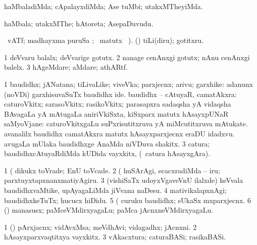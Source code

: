\bentry
{} 
\gl{\kirxvi}
\expl{}
\bmng
haMbaladiMda; cApalayxdiMda; Ase tuMbi; utakxMTheyiMda. 
\emng
\eentry

\bentry
{} 
\gl{\nA}
\expl{}
\bmng
haMbala; utakxMThe; hAtoreta; AsepaDuvudu. 
\emng
\eentry

\bentry
{} 
\gl{\kirx}
  \ucAcx\ vATf; madhayxma puruSa ; \BU\ matutx \BUkaq\ ).\bmng
(\pArxparx) tiLi(diru); gotitxru. 
\emng

\noindent
\gl{\pagu}
\expl{}
\bmng
\bnum
\num{1}  deVvaru balalx; deVvarige gotutx. 
\num{2}  nanage cenAnxgi gotutx; nAnu cenAnxgi balelx. 
\num{3}  hAgeMdare; aMdare; athARtf. 
\enum
\emng
\eentry

\bentry
{} 
\gl{\nA}
\expl{}
\bmng
\bnum
\num{1} baudidhx; jANatana; tiLivaLike; viveVka; parxjecnx; arivu; garxhike:  adanunx (noVDi) garxhisuvaSuTx baudidhx ide. 
 baudidhx -- cAtuyaR, camatAkxra: 
\banum
{} caturoVkitx; sarasoVkitx; rasikoVkitx; parasapxra sadaqsha yA vidaqsha BAvagaLa yA mAtugaLa aniriVkiSxta, kiSxparx matutx hAsayxpUNaR saMyoVjane:  caturoVkitxgaLu suPxrisutitxruva yA miMcutitxruva mAtukate.  avanalilx baudidhx camatAkxra matutx hAsayxparxjecnx eraDU idadxvu. 
 avugaLa mUlaka baudidhxge AnaMda niVDuva shakitx. 
\eanum
\numie
\num{3} catura; baudidhxcAtuyaRdiMda kUDida vayxkitx, (\kanmu\ catura hAsayxgAra). 
\enum
\emng

\noindent
\gl{\pagu}
\expl{}
\bmng
\bnum
\num{1}  (  dikukx toVrade; EnU toVcade. 
\num{2}  (  huSArAgi, ecacxradiMda -- iru; parxtuyxtapxnanxmatiyAgiru. 
\num{3}  (vishiSaTx udoyxVgaveVnU ilalxde) keVvala baudidhxvaMtike, upAyagaLiMda jiVvana naDesu. 
\num{4}  mativikalapxnAgi; baudidhxkeTuTx; hucucx hiDidu. 
\num{5}  (  curuku baudidhx; sUkaSx mxparxjecnx. 
\num{6}  (\pArxparx) manasusx; paMceVMdirxyagaLu; paMca jAcnxneVMdirxyagaLu. 
\enum
\emng
\eentry

\bentry
{} 
\gl{\nA}
\expl{}
\bmng
\bnum
\num{1} (\pArxparx) pArxjacnx; vidAvxMsa; meVdhAvi; vidagadhx; jAcnxni. 
\num{2} hAsayxparxvaqtitxya vayxkitx. 
\num{3} vAkacxtura; caturaBASi; rasikaBASi. 
\enum
\emng
\eentry

